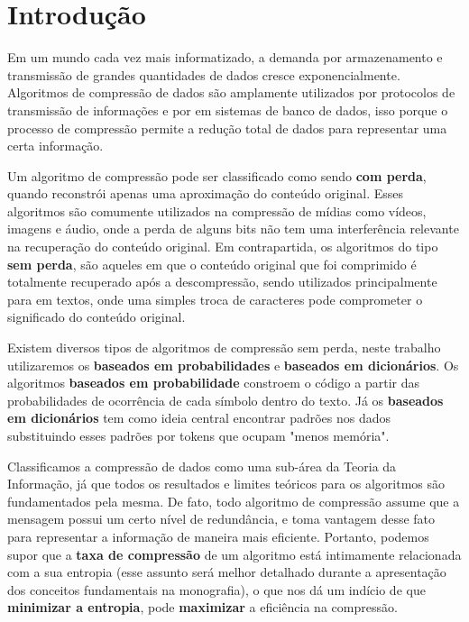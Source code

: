 
\chapter*[Introdução]{Introdução}

Em um mundo cada vez mais informatizado, a demanda por armazenamento e transmissão de grandes quantidades de dados cresce exponencialmente.  
Algoritmos de compressão de dados são amplamente utilizados por protocolos de transmissão de informações e por em sistemas de banco de dados, isso porque o processo de compressão permite a redução total de dados para representar uma certa informação.

Um algoritmo de compressão pode ser classificado como sendo \textbf{com perda}, quando reconstrói apenas uma aproximação do conteúdo original. 
Esses algoritmos são comumente utilizados na compressão de mídias como vídeos, imagens e áudio, onde a perda de alguns bits não tem uma interferência relevante na recuperação do conteúdo original. 
Em contrapartida, os algoritmos do tipo \textbf{sem perda}, são aqueles em que o conteúdo original que foi comprimido é totalmente recuperado após a descompressão, sendo utilizados principalmente para em textos, onde uma simples troca de caracteres pode comprometer o significado do conteúdo original. 

Existem diversos tipos de algoritmos de compressão sem perda, neste trabalho utilizaremos os \textbf{baseados em probabilidades} e \textbf{baseados em dicionários}. 
Os algoritmos \textbf{baseados em probabilidade} constroem o código a partir das probabilidades de ocorrência de cada símbolo dentro do texto. 
Já os \textbf{baseados em dicionários} tem como ideia central encontrar padrões nos dados substituindo esses padrões por tokens que ocupam "menos memória".

Classificamos a compressão de dados como uma sub-área da Teoria da Informação, já que todos os resultados e limites teóricos para os algoritmos são fundamentados pela mesma. 
De fato, todo algoritmo de compressão assume que a mensagem possui um certo nível de redundância, e toma vantagem desse fato para representar a informação de maneira mais eficiente. 
Portanto, podemos supor que a \textbf{taxa de compressão} de um algoritmo está intimamente relacionada com a sua entropia (esse assunto será melhor detalhado durante a apresentação dos conceitos fundamentais na monografia), o que nos dá um indício de que \textbf{minimizar a entropia}, pode \textbf{maximizar} a eficiência na compressão.

